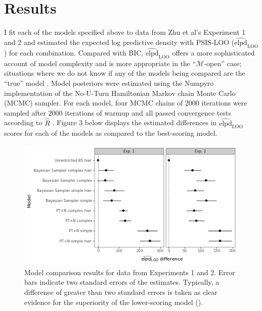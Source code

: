 \documentclass[
  man,floatsintext]{apa6}
\begin{document}
\hypertarget{results}{%
\section{Results}\label{results}}

I fit each of the models specified above to data from Zhu et al's \autocite*{zhu.etal2020} Experiment 1 and 2 and estimated the expected log predictive density with PSIS-LOO (\(\widehat{\text{elpd}}_{\text{LOO}}\)) for each combination. Compared with BIC, \(\widehat{\text{elpd}}_{\text{LOO}}\) offers a more sophisticated account of model complexity and is more appropriate in the ``\(\mathcal{M}\)-open'' case; situations where we do not know if any of the models being compared are the ``true'' model \autocite{vehtari.etal2019}. Model posteriors were estimated using the Numpyro \autocite{phan.etal2019} implementation of the No-U-Turn Hamiltonian Markov chain Monte Carlo (MCMC) sampler. For each model, four MCMC chains of 2000 iterations were sampled after 2000 iterations of warmup and all passed convergence tests according to \(\hat{R}\) \autocite[see][]{gelman.etal2014a}. Figure 3 below displays the estimated differences in \(\widehat{\text{elpd}}_{\text{LOO}}\) scores for each of the models as compared to the best-scoring model.

\begin{figure}[ht]
\centering
\includegraphics[width=6in]{plot_compare.png}
\caption[]{Model comparison results for data from Experiments 1 and 2. Error bars indicate two standard errors of the estimates. Typically, a difference of greater than two standard errors is taken as clear evidence for the superiority of the lower-scoring model (\cite{sivula.etal2020}).}
\end{figure}
\end{document}
